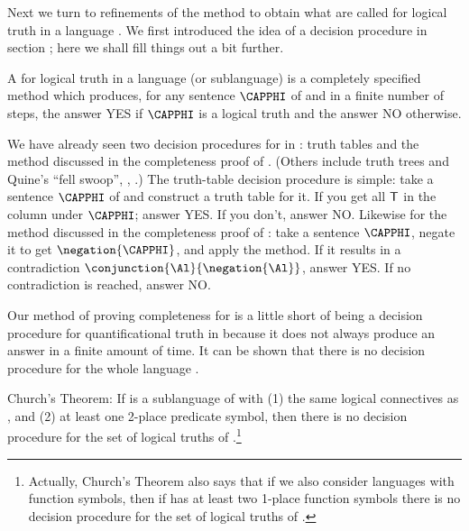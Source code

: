 Next we turn to refinements of the method to obtain what are called  for logical truth in a language . %
We first introduced the idea of a decision procedure in section ; here we shall fill things out a bit further. 
\begin{majorILnc}{}
A  for logical truth in a language (or sublanguage)  is a completely specified method which produces, for any sentence $\CAPPHI$ of  and in a finite number of steps, the answer YES if $\CAPPHI$ is a logical truth and the answer NO otherwise.
\end{majorILnc}
\begin{majorILnc}{}
We have already seen two decision procedures for  in \GSL{}: truth tables and the method discussed in the completeness proof of \GSD{}. 
(Others include truth trees and Quine's ``fell swoop'', \citealt{Quine1950}, \citealt[23]{Hodges2001}.)
The truth-table decision procedure is simple: take a sentence $\CAPPHI$ of \GSL{} and construct a truth table for it. If you get all $\mathsf{T}{}$ in the column under $\CAPPHI$; answer YES. If you don't, answer NO. 
Likewise for the method discussed in the completeness proof of \GSD{}: take a sentence $\CAPPHI$, negate it to get $\negation{\CAPPHI}$, and apply the method. 
If it results in a contradiction $\conjunction{\Al}{\negation{\Al}}$, answer YES. 
If no contradiction is reached, answer NO. 
\end{majorILnc}
\noindent{}Our method of proving completeness for \GQD{} is a little short of being a decision procedure for quantificational truth in \GQL{} because it does not always produce an answer in a finite amount of time.
It can be shown that there is no decision procedure for the whole language \GQL{} \citetext{\citealp[83--86]{Hodges2001}, \citeyear[31]{Hodges2001b}, \citealp[486]{Bergmann2003}}.
\begin{THEOREM}{ Church's Theorem:}
If  is a sublanguage of \GQL{} with (1) the same logical connectives as \GQL{}, and (2) at least one 2-place predicate symbol, then there is no decision procedure for the set of logical truths of .\footnote{Actually, 
Church's Theorem also says that if we also consider languages with function symbols, then if  has at least two 1-place function symbols there is no decision procedure for the set of logical truths of .}
\end{THEOREM}
